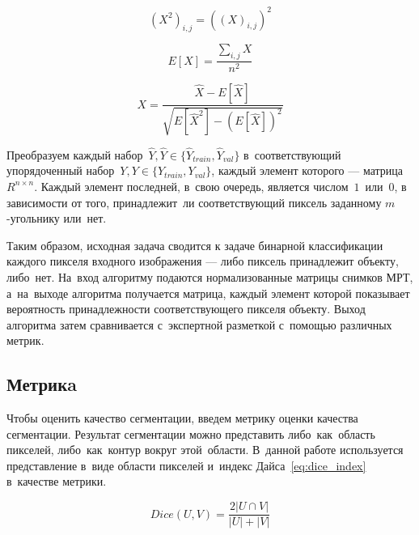 \begin{equation}
\label{eq:input_squared}
(X^{2})_{i,j}=((X)_{i,j})^{2}
\end{equation}

\begin{equation}
\label{eq:input_expected_value}
E[X]=\frac{
  \sum_{i,j}X
}{
  n^{2}
}
\end{equation} 

\begin{equation}
\label{eq:input_normalized}
X = \frac{
  \hat{X} - E[\hat{X}]
}{\sqrt{
  E[\hat{X}^{2}] - (E[\hat{X}])^2
}}
\end{equation}

Преобразуем каждый набор~$\hat{Y},\hat{Y}\in{}\{\hat{Y}_{train},\hat{Y}_{val}\}$ 
в~соответствующий упорядоченный набор~$Y,Y\in{}\{Y_{train},Y_{val}\}$, 
каждый элемент которого — матрица~$R^{n\times{}n}$. Каждый элемент последней, 
в~свою очередь, является числом~$1$~или~$0$, в зависимости от того, принадлежит~ли 
соответствующий пиксель заданному \mbox{$m$-угольнику} или~нет.

Таким образом, исходная задача сводится к задаче бинарной классификации каждого пикселя 
входного изображения — либо пиксель принадлежит объекту, либо~нет. На~вход алгоритму 
подаются нормализованные матрицы снимков МРТ, а~на~выходе алгоритма получается матрица, 
каждый элемент которой показывает вероятность принадлежности соответствующего пикселя объекту. 
Выход алгоритма затем сравнивается с~экспертной разметкой с~помощью различных метрик.

\subsection{Метрикa}

Чтобы оценить качество сегментации, введем метрику оценки качества сегментации. Результат сегментации 
можно представить либо~как~область пикселей, либо~как~контур вокруг этой~области. В~данной работе 
используется представление в~виде области пикселей и~индекс Дайса~\eqref{eq:dice_index} в~качестве метрики. 

\begin{equation}
\label{eq:dice_index}
  Dice(U,V) = \frac{2|U\cap{}V|}{|U| + |V|}
\end{equation}
